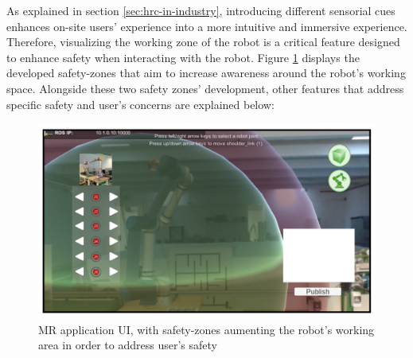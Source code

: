 As explained in section \ref{sec:hrc-in-industry}, introducing different sensorial cues enhances on-site users' experience into a more intuitive and immersive experience. Therefore, visualizing the working zone of the robot is a critical feature designed to enhance safety when interacting with the robot. Figure \ref{fig:safety-zones} displays the developed safety-zones that aim to increase awareness around the robot's working space. Alongside these two safety zones' development, other features that address specific safety and user's concerns are explained below:  

\begin{figure}[h]
    \centering
    \includegraphics[width=\linewidth]{figs/safet-zones.png}
    \caption{\ac{MR} application \ac{UI}, with safety-zones aumenting the robot's working area in order to address user's safety}
    \label{fig:safety-zones}
\end{figure}

